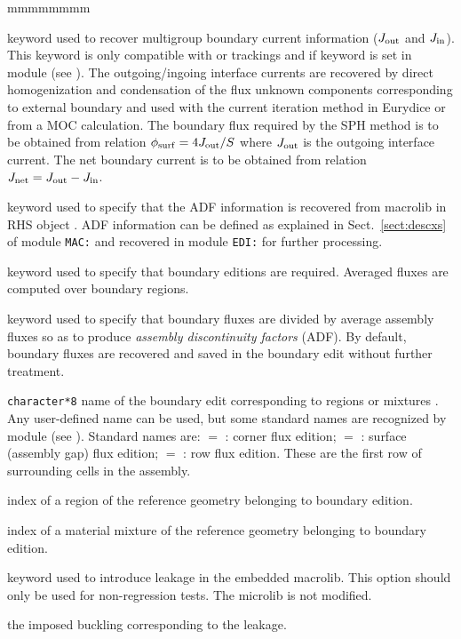 \begin{ListeDeDescription}{mmmmmmmm}
\item[\moc{JOUT}] keyword used to recover multigroup boundary current information ($J_{\rm out}$ and $J_{\rm in}$). This keyword
is only compatible with  or  trackings and if keyword  is set in module 
(see ). The outgoing/ingoing interface currents are recovered by direct homogenization and condensation of the
flux unknown components corresponding to external boundary and used with the current iteration method in Eurydice or from a MOC
calculation. The boundary flux required by the SPH method is to be obtained from relation $\phi_{\rm surf}=4J_{\rm out}/S$ where
$J_{\rm out}$ is the outgoing interface current. The net boundary current is to be obtained from relation
$J_{\rm net}=J_{\rm out}-J_{\rm in}$.

\item[\moc{ADFM}] keyword used to specify that the ADF information is recovered from macrolib in RHS object . ADF information can
be defined as explained in Sect.~\ref{sect:descxs} of module {\tt MAC:} and recovered in module {\tt EDI:} for further processing.

\item[\moc{ADF}] keyword used to specify that boundary editions are required. Averaged fluxes are
computed over boundary regions.

\item[\moc{*}] keyword used to specify that boundary fluxes are divided by average assembly fluxes so as to produce {\sl assembly discontinuity factors}
(ADF). By default, boundary fluxes are recovered and saved in the boundary edit without further treatment.

\item[\dusa{TYPE}] {\tt character*8} name of the boundary edit corresponding to
regions  or mixtures . Any user-defined name can be used, but some
standard names are recognized by module  (see ). Standard names are: $=$ :
corner flux edition; $=$ : surface (assembly gap) flux edition; $=$ :
row flux edition. These are the first row of surrounding cells in the assembly.

\item[\dusa{ireg}] index of a region of the reference geometry belonging to boundary edition.

\item[\dusa{imix}] index of a material mixture of the reference geometry belonging to boundary edition.

\item[\moc{LEAK}] keyword used to introduce leakage in the embedded {\sc macrolib}. This option should only be used for non-regression tests. The {\sc microlib} is not modified.

\item[\dusa{b2}] the imposed buckling corresponding to the leakage.

\end{ListeDeDescription}

